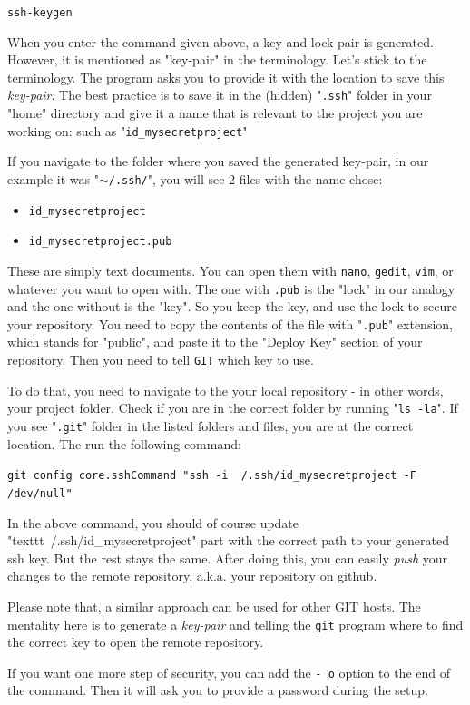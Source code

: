     \begin{tcolorbox}
        \texttt{ssh-keygen}
    \end{tcolorbox}

    When you enter the command given above, a key and lock pair is generated. However, it is mentioned as "key-pair" in the terminology. Let's stick to the terminology. The program asks you to provide it with the location to save this \textit{key-pair}. The best practice is to save it in the (hidden) "\texttt{.ssh}" folder in your "home" directory and give it a name that is relevant to the project you are working on: such as "\texttt{id\_mysecretproject}"

    If you navigate to the folder where you saved the generated key-pair, in our example it was "\texttt{$\sim$/.ssh/}", you will see 2 files with the name chose:
    \begin{itemize}
        \item \texttt{id\_mysecretproject}
        \item \texttt{id\_mysecretproject.pub}
    \end{itemize}

    These are simply text documents. You can open them with \texttt{nano}, \texttt{gedit}, \texttt{vim}, or whatever you want to open with. The one with \texttt{.pub} is the "lock" in our analogy and the one without is the "key". So you keep the key, and use the lock to secure your repository. You need to copy the contents of the file with "\texttt{.pub}" extension, which stands for "public", and paste it to the "Deploy Key" section of your repository. Then you need to tell \texttt{GIT} which key to use.

    To do that, you need to navigate to the your local repository - in other words, your project folder. Check if you are in the correct folder by running "\texttt{ls -la}". If you see "\texttt{.git}" folder in the listed folders and files, you are at the correct location. The run the following command:
    
    \begin{tcolorbox}
        \texttt{git config core.sshCommand "ssh -i ~/.ssh/id\_mysecretproject -F /dev/null"}
    \end{tcolorbox}

    In the above command, you should of course update "texttt{~/.ssh/id\_mysecretproject}" part with the correct path to your generated ssh key. But the rest stays the same. After doing this, you can easily \textit{push} your changes to the remote repository, a.k.a. your repository on github.

    Please note that, a similar approach can be used for other GIT hosts. The mentality here is to generate a \textit{key-pair} and telling the \texttt{git} program where to find the correct key to open the remote repository.

    If you want one more step of security, you can add the \texttt{- o} option to the end of the command. Then it will ask you to provide a password during the setup.